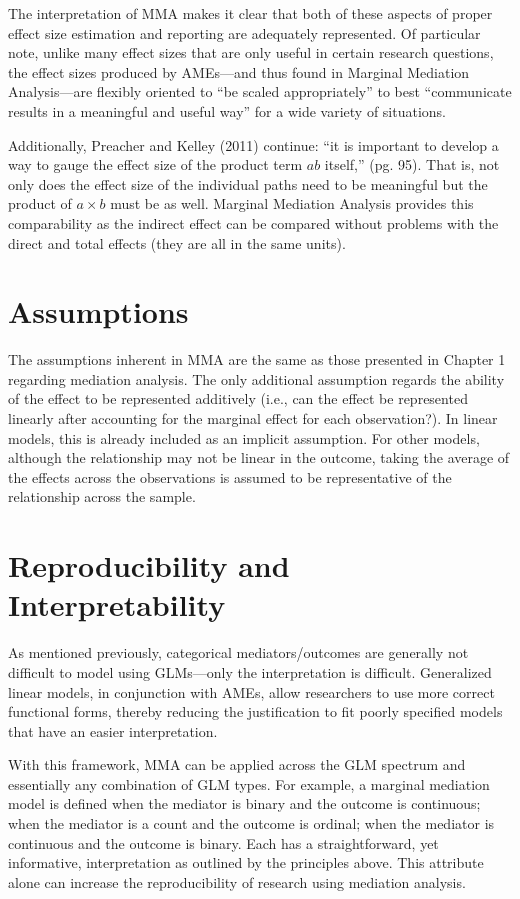 \documentclass[]{DissertateUSU}
\begin{document}
The interpretation of MMA makes it clear that both of these aspects of
proper effect size estimation and reporting are adequately represented.
Of particular note, unlike many effect sizes that are only useful in
certain research questions, the effect sizes produced by AMEs---and thus
found in Marginal Mediation Analysis---are flexibly oriented to ``be
scaled appropriately'' to best ``communicate results in a meaningful and
useful way'' for a wide variety of situations.

Additionally, Preacher and Kelley (2011) continue: ``it is important to
develop a way to gauge the effect size of the product term \(ab\)
itself,'' (pg. 95). That is, not only does the effect size of the
individual paths need to be meaningful but the product of \(a \times b\)
must be as well. Marginal Mediation Analysis provides this comparability
as the indirect effect can be compared without problems with the direct
and total effects (they are all in the same units).

\section{Assumptions}\label{assumptions-1}

The assumptions inherent in MMA are the same as those presented in
Chapter 1 regarding mediation analysis. The only additional assumption
regards the ability of the effect to be represented additively (i.e.,
can the effect be represented linearly after accounting for the marginal
effect for each observation?). In linear models, this is already
included as an implicit assumption. For other models, although the
relationship may not be linear in the outcome, taking the average of the
effects across the observations is assumed to be representative of the
relationship across the sample.

\section{Reproducibility and
Interpretability}\label{reproducibility-and-interpretability}

As mentioned previously, categorical mediators/outcomes are generally
not difficult to model using GLMs---only the interpretation is
difficult. Generalized linear models, in conjunction with AMEs, allow
researchers to use more correct functional forms, thereby reducing the
justification to fit poorly specified models that have an easier
interpretation.

With this framework, MMA can be applied across the GLM spectrum and
essentially any combination of GLM types. For example, a marginal
mediation model is defined when the mediator is binary and the outcome
is continuous; when the mediator is a count and the outcome is ordinal;
when the mediator is continuous and the outcome is binary. Each has a
straightforward, yet informative, interpretation as outlined by the
principles above. This attribute alone can increase the reproducibility
of research using mediation analysis.
\end{document}

